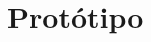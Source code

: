 \documentclass[english,brazilian]{UNISINOSmonografia} %
\begin{document}
%














\section{Protótipo}
\end{document}
